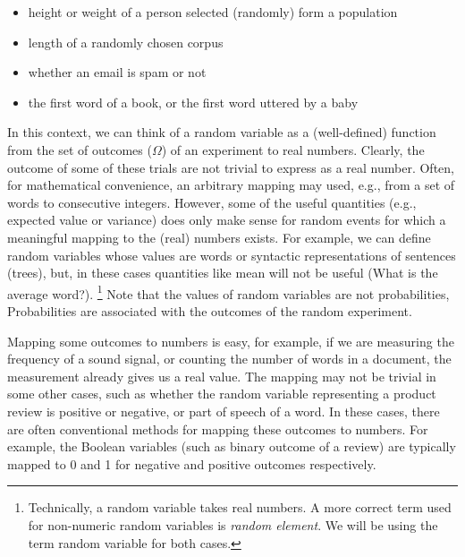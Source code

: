 \begin{itemize}
  \item height or weight of a person selected (randomly) form a population
  \item length of a randomly chosen corpus
  \item whether an email is spam or not
  \item the first word of a book, or the first word uttered by a baby
\end{itemize}

In this context,
we can think of a random variable as a (well-defined) function
from the set of outcomes ($\Omega$) of an experiment to real numbers.
Clearly,
the outcome of some of these trials are not trivial to express as a real number.
Often, for mathematical convenience,
an arbitrary mapping may used,
e.g., from a set of words to consecutive integers.
However,
some of the useful quantities
(e.g., expected value or variance) does only make sense
for random events for which a meaningful mapping to the (real) numbers exists.
For example, we can define random variables whose values are
words or syntactic representations of sentences (trees),
but, in these cases quantities like mean will not be useful
(What is the average word?).%
\footnote{%
  Technically, a random variable takes real numbers.
  A more correct term used for non-numeric random variables is \emph{random element}.
  We will be using the term random variable for both cases.
}
Note that the values of random variables are not probabilities,
Probabilities are associated with the outcomes of the random experiment.

Mapping some outcomes to numbers is easy,
for example, if we are measuring the frequency of a sound signal,
or counting the number of words in a document,
the measurement already gives us a real value.
The mapping may not be trivial in some other cases,
such as whether the random variable representing
a product review is positive or negative,
or part of speech of a word.
In these cases,
there are often conventional methods for mapping these outcomes to numbers.
For example,
the Boolean variables (such as binary outcome of a review)
are typically mapped to \num{0} and \num{1} for negative and positive outcomes respectively.


